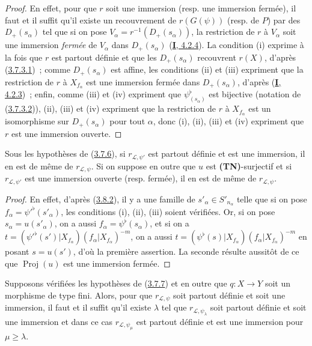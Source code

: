 \begin{proof}
En effet, pour que $r$ soit une immersion (resp. une immersion fermée), il
faut et il suffit qu'il existe un recouvrement de $r(G(\psi))$ (resp. de
$P$) par des $D_+(s_\alpha)$ tel que si on pose
$V_\alpha=r^{-1}(D_+(s_\alpha))$, la restriction de $r$ à $V_\alpha$ soit
une immersion \emph{fermée} de $V_\alpha$ dans $D_+(s_\alpha)$
(\hyperref[I.4.2.4-fr]{\textbf{I}, 4.2.4}). La condition (i) exprime à la fois que
$r$ est partout définie et que les $D_+(s_\alpha)$ recouvrent $r(X)$,
d'après (\hyperref[II.3.7.3.1-fr]{3.7.3.1})~; comme $D_+(s_\alpha)$ est
affine, les conditions (ii) et (iii) expriment que la restriction de $r$ à
$X_{f_\alpha}$ est une immersion fermée dans $D_+(s_\alpha)$, d'après
(\hyperref[I.4.2.3-fr]{\textbf{I}, 4.2.3})~; enfin, comme (iii) et (iv) expriment que
$\psi_{(s_\alpha)}^\flat$ est bijective (notation de
(\hyperref[II.3.7.3.2-fr]{3.7.3.2})), (ii), (iii) et (iv) expriment que la
restriction de $r$ à $X_{f_\alpha}$ est un isomorphisme sur
$D_+(s_\alpha)$ pour tout $\alpha$, donc (i), (ii), (iii) et (iv) expriment
que $r$ est une immersion ouverte.
\end{proof}

\begin{corollary}[3.8.3]
\label{II.3.8.3-fr}
Sous les hypothèses de \textup{(\hyperref[II.3.7.6-fr]{3.7.6})}, si
$r_{\mathcal{L},\psi'}$ est partout définie et est une immersion, il en est
de même de $r_{\mathcal{L},\psi}$. Si on suppose en outre que $u$ est
\textup{\textbf{(TN)}}-surjectif et si $r_{\mathcal{L},\psi'}$ est une immersion
ouverte \textup{(resp.} fermée\textup{)}, il en est de même de $r_{\mathcal{L},\psi}$.
\end{corollary}

\begin{proof}
En effet, d'après (\hyperref[II.3.8.2-fr]{3.8.2}), il y a une famille de
$s'_\alpha\in S'_{n_\alpha}$ telle que si on pose
$f_\alpha=\psi'^\flat(s'_\alpha)$, les conditions (i), (ii), (iii) soient
vérifiées. Or, si on pose $s_\alpha=u(s'_\alpha)$, on a aussi
$f_\alpha=\psi^\flat(s_\alpha)$, et si on a
$t=(\psi'^\flat(s')|X_{f_\alpha})(f_\alpha|X_{f_\alpha})^{-m}$, on a aussi
$t=(\psi^\flat(s)|X_{f_\alpha})(f_\alpha|X_{f_\alpha})^{-m}$ en posant
$s=u(s')$, d'où la première assertion. La seconde résulte aussitôt de ce que
$\operatorname{Proj}(u)$ est une immersion fermée.
\end{proof}

\begin{proposition}[3.8.4]
\label{II.3.8.4-fr}
Supposons vérifiées les hypothèses de
\textup{(\hyperref[II.3.7.7-fr]{3.7.7})} et en outre que $q:X\to Y$ soit un morphisme
de type fini. Alors, pour que $r_{\mathcal{L},\psi}$ soit partout définie et
soit une immersion, il faut et il suffit qu'il existe $\lambda$ tel que
$r_{\mathcal{L},\psi_\lambda}$ soit partout définie et soit une immersion et
dans ce cas $r_{\mathcal{L},\psi_\mu}$ est partout définie et est une
immersion pour $\mu\geq\lambda$.
\end{proposition}

